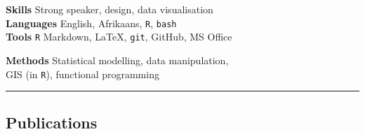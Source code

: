 \documentclass[10pt]{article}
\begin{document}


\begin{multicols}{2} %



\columnbreak

\textbf{Skills   }     \hfill      Strong speaker, design, data visualisation \\
\textbf{Languages}     \hfill   English, Afrikaans, \texttt{R}, \texttt{bash} \\
\textbf{Tools    }     \hfill \texttt{R} Markdown, { \selectfont
                              \LaTeX}, \texttt{git}, GitHub, MS Office

\textbf{Methods  }     \hfill       Statistical modelling, data manipulation, \\
                       \hfill     GIS (in \texttt{R}), functional programming

\end{multicols} %

\hrule

\subsection*{Publications} %



\hrulefill
\end{document}
